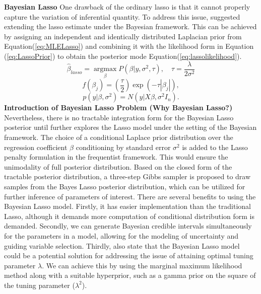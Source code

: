 \textbf{Bayesian Lasso}
One drawback of the ordinary lasso is that it cannot properly capture the variation of inferential quantity. To address this issue, \cite{tibshirani_1996} suggested extending the lasso estimate under the Bayesian framework. This can be achieved by assigning an independent and identically distributed Laplacian prior from Equation(\ref{eq:MLELasso}) and combining it with the likelihood form in Equation (\ref{eq:LassoPrior}) to obtain the posterior mode Equation(\ref{eq:lassolikelihood}). 
\begin{equation}
	\label{eq:MLELasso}
	\hat{\beta}_{lasso} = \underset{\beta}{\operatorname{argmax}}P(\beta|y,\sigma^2,\tau), \quad \tau = \frac{\lambda}{2\sigma^2}
\end{equation}
\begin{equation}
	\label{eq:LassoPrior}
	f(\beta_j) = \left(\frac{\tau}{2}\right) \exp(-\tau|\beta_j|),
\end{equation}
\begin{equation}
	\label{eq:lassolikelihood}
	p(y |\beta,\sigma^2) = N(y|X\beta,\sigma^2I_n).
\end{equation}
\textbf{Introduction of Bayesian Lasso Problem (Why Bayesian Lasso?)}
Nevertheless, there is no tractable integration form for the Bayesian Lasso posterior until \cite{park_casella_2008} further explores the Lasso model under the setting of the Bayesian framework. The choice of a conditional Laplace prior distribution over the regression coefficient $\beta$ conditioning by standard error $\sigma^2$ is added to the Lasso penalty formulation in the frequentist framework. This would ensure the unimodality of full posterior distribution. Based on the closed form of the tractable posterior distribution, a three-step Gibbs sampler is proposed to draw samples from the Bayes Lasso posterior distribution, which can be utilized for further inference of parameters of interest.
There are several benefits to using the Bayesian Lasso model. Firstly, it has easier implementation than the traditional Lasso, although it demands more computation of conditional distribution form is demanded. Secondly, we can generate Bayesian credible intervals simultaneously for the parameters in a model, allowing for the modeling of uncertainty and guiding variable selection.
Thirdly, \cite{park_casella_2008} also state that the Bayesian Lasso model could be a potential solution for addressing the issue of attaining optimal tuning parameter $\lambda$. We can achieve this by using the marginal maximum likelihood method along with a suitable hyperprior, such as a gamma prior on the square of the tuning parameter ($\lambda^2$).
